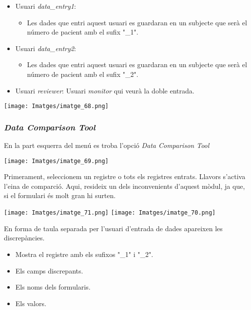 \documentclass[
]{article}
\providecommand{\tightlist}{%
  \setlength{\itemsep}{0pt}\setlength{\parskip}{0pt}}
\begin{document}
\begin{itemize}
\tightlist
\item
  Usuari \emph{data\_entry1}:

  \begin{itemize}
  \tightlist
  \item
    Les dades que entri aquest usuari es guardaran en un subjecte que serà el número de pacient amb el sufix "\_1".
  \end{itemize}
\item
  Usuari \emph{data\_entry2}:

  \begin{itemize}
  \tightlist
  \item
    Les dades que entri aquest usuari es guardaran en un subjecte que serà el número de pacient amb el sufix "\_2".
  \end{itemize}
\item
  Usuari \emph{reviewer}: Usuari \emph{monitor} qui veurà la doble entrada.
\end{itemize}

\texttt{[image: Imatges/imatge\_68.png]}

\hypertarget{data-comparison-tool}{%
\subsubsection{\texorpdfstring{\emph{Data Comparison Tool}}{Data Comparison Tool}}\label{data-comparison-tool}}

En la part esquerra del menú es troba l'opció \emph{Data Comparison Tool}

\texttt{[image: Imatges/imatge\_69.png]}

Primerament, seleccionem un registre o tots els registres entrats. Llavors s'activa l'eina de comparció. Aqui, resideix un dels inconvenients d'aquest mòdul, ja que, si el formulari és molt gran hi surten.

\texttt{[image: Imatges/imatge\_71.png]}
\texttt{[image: Imatges/imatge\_70.png]}

En forma de taula separada per l'usuari d'entrada de dades apareixen les discrepàncies.

\begin{itemize}
\tightlist
\item
  Mostra el registre amb els sufixos "\_1" i "\_2".
\item
  Els camps discrepants.
\item
  Els noms dels formularis.
\item
  Els valors.
\end{itemize}
\end{document}
